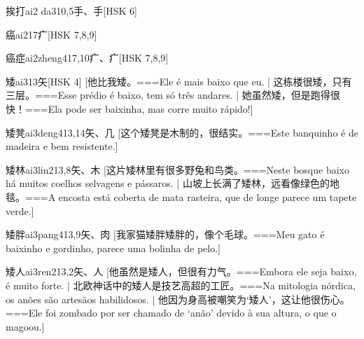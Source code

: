 \begin{EntryWithPhonetic}{挨打}{ai2 da3}{10,5}{⼿、⼿}[HSK 6]
\end{EntryWithPhonetic}

\begin{EntryWithPhonetic}{癌}{ai2}{17}{⽧}[HSK 7,8,9]
\end{EntryWithPhonetic}

\begin{EntryWithPhonetic}{癌症}{ai2zheng4}{17,10}{⽧、⽧}[HSK 7,8,9]
\end{EntryWithPhonetic}

\begin{EntryWithPhonetic}{矮}{ai3}{13}{⽮}[HSK 4]
  [他比我矮。===Ele é mais baixo que eu. | 这栋楼很矮，只有三层。===Esse prédio é baixo, tem só três andares. | 她虽然矮，但是跑得很快！===Ela pode ser baixinha, mas corre muito rápido!]
\end{EntryWithPhonetic}

\begin{EntryWithPhonetic}{矮凳}{ai3deng4}{13,14}{⽮、⼏}
  [这个矮凳是木制的，很结实。===Este banquinho é de madeira e bem resistente.]
\end{EntryWithPhonetic}

\begin{EntryWithPhonetic}{矮林}{ai3lin2}{13,8}{⽮、⽊}
  [这片矮林里有很多野兔和鸟类。===Neste bosque baixo há muitos coelhos selvagens e pássaros. | 山坡上长满了矮林，远看像绿色的地毯。===A encosta está coberta de mata rasteira, que de longe parece um tapete verde.]
\end{EntryWithPhonetic}

\begin{EntryWithPhonetic}{矮胖}{ai3pang4}{13,9}{⽮、⾁}
  [我家猫矮胖矮胖的，像个毛球。===Meu gato é baixinho e gordinho, parece uma bolinha de pelo.]
\end{EntryWithPhonetic}

\begin{EntryWithPhonetic}{矮人}{ai3ren2}{13,2}{⽮、⼈}
  [他虽然是矮人，但很有力气。===Embora ele seja baixo, é muito forte. | 北欧神话中的矮人是技艺高超的工匠。===Na mitologia nórdica, os anões são artesãos habilidosos. | 他因为身高被嘲笑为‘矮人’，这让他很伤心。===Ele foi zombado por ser chamado de ‘anão’ devido à sua altura, o que o magoou.]
\end{EntryWithPhonetic}

